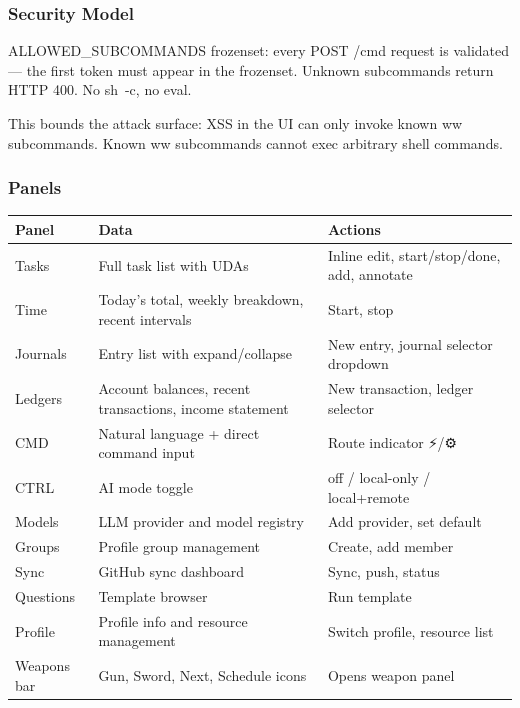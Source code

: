 \documentclass[11pt, a4paper, DIV=14]{scrartcl}
\renewcommand{\texttt}[1]{{\ttfamily\fontsize{8.5}{10.5}\selectfont\color{BabbNavy}#1}}
\begin{document}
\subsubsection{Security Model}\label{security-model}

\texttt{ALLOWED\_SUBCOMMANDS} frozenset: every POST /cmd request is
validated --- the first token must appear in the frozenset. Unknown
subcommands return HTTP 400. No \texttt{sh\ -c}, no eval.

This bounds the attack surface: XSS in the UI can only invoke known ww
subcommands. Known ww subcommands cannot exec arbitrary shell commands.

\subsubsection{Panels}\label{panels}

{\def\LTcaptype{none} %
\begin{longtable}[]{@{}
  >{\raggedright\arraybackslash}p{}
  >{\raggedright\arraybackslash}p{}
  >{\raggedright\arraybackslash}p{}@{}}
\toprule\noalign{}
\begin{minipage}[b]{\linewidth}\raggedright
Panel
\end{minipage} & \begin{minipage}[b]{\linewidth}\raggedright
Data
\end{minipage} & \begin{minipage}[b]{\linewidth}\raggedright
Actions
\end{minipage} \\
\midrule\noalign{}
\endhead
\bottomrule\noalign{}
\endlastfoot
Tasks & Full task list with UDAs & Inline edit, start/stop/done, add,
annotate \\
Time & Today's total, weekly breakdown, recent intervals & Start,
stop \\
Journals & Entry list with expand/collapse & New entry, journal selector
dropdown \\
Ledgers & Account balances, recent transactions, income statement & New
transaction, ledger selector \\
CMD & Natural language + direct command input & Route indicator ⚡/⚙ \\
CTRL & AI mode toggle & off / local-only / local+remote \\
Models & LLM provider and model registry & Add provider, set default \\
Groups & Profile group management & Create, add member \\
Sync & GitHub sync dashboard & Sync, push, status \\
Questions & Template browser & Run template \\
Profile & Profile info and resource management & Switch profile,
resource list \\
Weapons bar & Gun, Sword, Next, Schedule icons & Opens weapon panel \\
\end{longtable}
}
\end{document}

